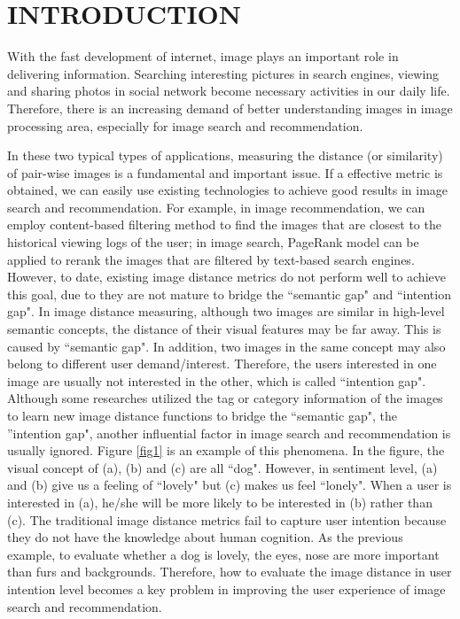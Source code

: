 \section{INTRODUCTION}
With the fast development of internet, image plays an important role in delivering information. Searching interesting pictures in search engines, viewing and sharing photos in social network become necessary activities in our daily life. Therefore, there is an increasing demand of better understanding images in image processing area, especially for image search and recommendation.

In these two typical types of applications, measuring the distance (or similarity) of pair-wise images is a fundamental and important issue. If a effective metric is obtained, we can easily use existing technologies to achieve good results in image search and recommendation. For example, in image recommendation, we can employ content-based filtering method to find the images that are closest to the historical viewing logs of the user\cite{cbf}; in image search, PageRank model can be applied to rerank the images that are filtered by text-based search engines\cite{visualrank}. However, to date, existing image distance metrics do not perform well to achieve this goal, due to they are not mature to bridge the ``semantic gap" and ``intention gap". In image distance measuring, although two images are similar in high-level semantic concepts, the distance of their visual features may be far away. This is caused by ``semantic gap". In addition, two images in the same concept may also belong to different user demand/interest. Therefore, the users interested in one image are usually not interested in the other, which is called ``intention gap". Although some researches utilized the tag or category information of the images to learn new image distance functions to bridge the ``semantic gap", the ''intention gap", another influential factor in image search and recommendation is usually ignored. Figure \ref{fig1} is an example of this phenomena. In the figure, the visual concept of (a), (b) and (c) are all ``dog". However, in sentiment level, (a) and (b) give us a feeling of ``lovely" but (c) makes us feel ``lonely". When a user is interested in (a), he/she will be more likely to be interested in (b) rather than (c). The traditional image distance metrics fail to capture user intention because they do not have the knowledge about human cognition. As the previous example, to evaluate whether a dog is lovely, the eyes, nose are more important than furs and backgrounds. Therefore, how to evaluate the image distance in user intention level becomes a key problem in improving the user experience of image search and recommendation.

